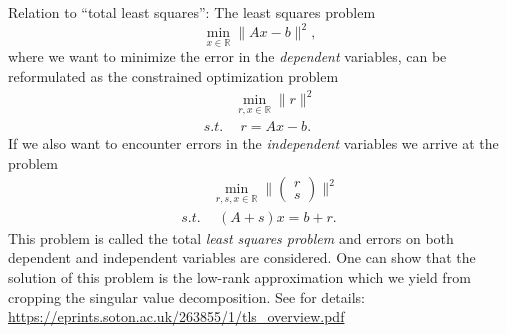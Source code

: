 {Relation to ``total least squares'': The least squares problem 
$$
\min \limits_{x\in \mathbb{R}} \| Ax-b \|^2,
$$
where we want to minimize the error in the \textit{dependent} variables,
can be reformulated as the constrained optimization problem 
\begin{align*}
&\min \limits_{r, x\in \mathbb{R}} \| r\|^2 \\
s.t.& ~~
r = Ax-b.
\end{align*}
If we also want to encounter errors in the \textit{independent} variables we arrive at the problem 
\begin{align*}
&\min \limits_{r, s, x\in \mathbb{R}} \| \begin{pmatrix}
r\\s
\end{pmatrix} \|^2 \\
s.t.& ~~
(A + s)x = b + r.
\end{align*}
This problem is called the total \textit{least squares problem} and errors on both dependent and independent variables are considered. One can show that the solution of this problem is the low-rank approximation which we yield from cropping the singular value decomposition. See for details:
\url{https://eprints.soton.ac.uk/263855/1/tls_overview.pdf}
}